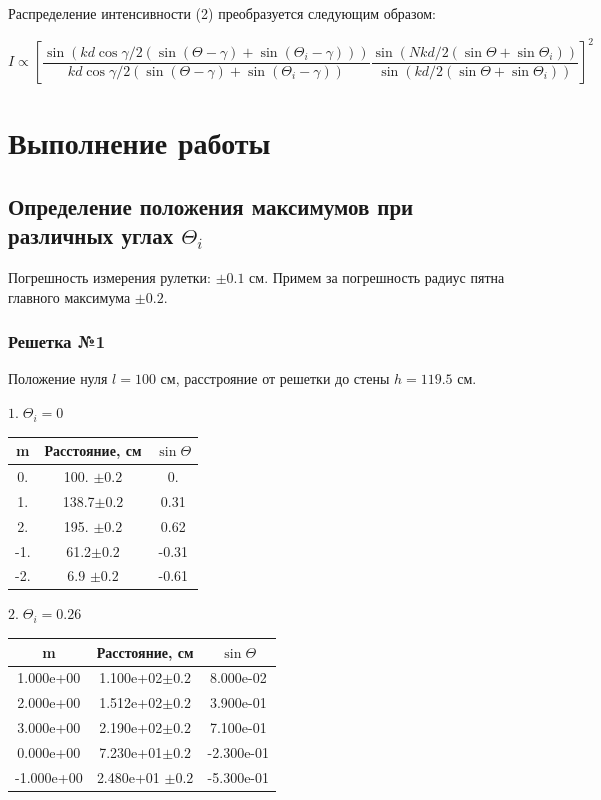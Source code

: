 \documentclass[a4paper, 12pt]{article}
\begin{document}
Распределение интенсивности (2) преобразуется следующим образом:

\begin{equation}
I \propto \left[\frac{\sin(kd\cos\gamma/2(\sin(\Theta-\gamma)+\sin(\Theta_i-\gamma)))} {kd\cos\gamma/2(\sin(\Theta-\gamma)+\sin(\Theta_i-\gamma))} \frac{\sin(Nkd/2(\sin\Theta+\sin\Theta_i))} {\sin(kd/2(\sin\Theta+\sin\Theta_i))}\right]^2
\end{equation}

\section{Выполнение работы}

\subsection{Определение положения максимумов при различных углах $\Theta_i$}
Погрешность измерения рулетки: $\pm0.1$ см. Примем за погрешность радиус пятна главного максимума $\pm0.2$.
\subsubsection{Решетка №1}
Положение нуля $l = 100$ см, расстрояние от решетки до стены $h = 119.5$ см.



$1. \; \Theta_i = 0$\\
\begin{center}
\begin{tabular}{| c| c | c |}
\hline
m  &  Расстояние, см & $\sin\Theta $\\ 
\hline
0. &  100. $\pm0.2$ & 0.\\
1. &  138.7$\pm0.2$  & 0.31\\
2. &  195. $\pm0.2$ & 0.62\\
-1.  & 61.2$\pm0.2$  &  -0.31\\
-2. & 6.9 $\pm0.2$ &  -0.61\\
\hline
\end{tabular}
\end{center}


$2. \; \Theta_i = 0.26$\\
\begin{center}
\begin{tabular}{| c| c | c |}
\hline
m  &  Расстояние, см & $\sin\Theta $\\ 
\hline
1.000e+00 & 1.100e+02$\pm0.2$  & 8.000e-02\\
2.000e+00 & 1.512e+02$\pm0.2$  & 3.900e-01\\
3.000e+00 & 2.190e+02$\pm0.2$   &7.100e-01\\
0.000e+00 & 7.230e+01$\pm0.2$  &-2.300e-01\\
-1.000e+00 & 2.480e+01 $\pm0.2$ & -5.300e-01\\
\hline
\end{tabular}
\end{center}
\end{document}
